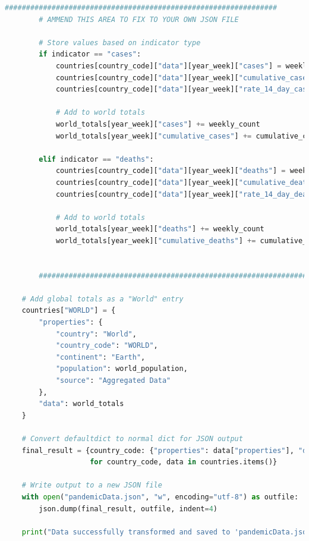 \documentclass{report}
\begin{document}
\begin{lstlisting}[language=Python]
        ################################################################
        # AMMEND THIS AREA TO FIX TO YOUR OWN JSON FILE
        
        # Store values based on indicator type
        if indicator == "cases":
            countries[country_code]["data"][year_week]["cases"] = weekly_count
            countries[country_code]["data"][year_week]["cumulative_cases"] = cumulative_count
            countries[country_code]["data"][year_week]["rate_14_day_cases"] = rate_14_day
    
            # Add to world totals
            world_totals[year_week]["cases"] += weekly_count
            world_totals[year_week]["cumulative_cases"] += cumulative_count
    
        elif indicator == "deaths":
            countries[country_code]["data"][year_week]["deaths"] = weekly_count
            countries[country_code]["data"][year_week]["cumulative_deaths"] = cumulative_count
            countries[country_code]["data"][year_week]["rate_14_day_deaths"] = rate_14_day
    
            # Add to world totals
            world_totals[year_week]["deaths"] += weekly_count
            world_totals[year_week]["cumulative_deaths"] += cumulative_count
    
    
        ################################################################
            
    # Add global totals as a "World" entry
    countries["WORLD"] = {
        "properties": {
            "country": "World",
            "country_code": "WORLD",
            "continent": "Earth",
            "population": world_population,
            "source": "Aggregated Data"
        },
        "data": world_totals
    }
    
    # Convert defaultdict to normal dict for JSON output
    final_result = {country_code: {"properties": data["properties"], "data": dict(data["data"])} 
                    for country_code, data in countries.items()}
    
    # Write output to a new JSON file
    with open("pandemicData.json", "w", encoding="utf-8") as outfile:
        json.dump(final_result, outfile, indent=4)
    
    print("Data successfully transformed and saved to 'pandemicData.json'")
\end{lstlisting}
\end{document}
